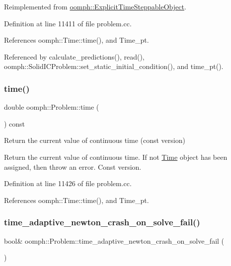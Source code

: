 Reimplemented from \hyperlink{classoomph_1_1ExplicitTimeSteppableObject_a42fde674301963f01b8e41b3f333cc65}{oomph\+::\+Explicit\+Time\+Steppable\+Object}.



Definition at line 11411 of file problem.\+cc.



References oomph\+::\+Time\+::time(), and Time\+\_\+pt.



Referenced by calculate\+\_\+predictions(), read(), oomph\+::\+Solid\+I\+C\+Problem\+::set\+\_\+static\+\_\+initial\+\_\+condition(), and time\+\_\+pt().

\mbox{\label{classoomph_1_1Problem_a925acb2e840deb4edc6305da8fced0e3}} 
\subsubsection{\texorpdfstring{time()}{time()}\hspace{0.1cm}{\footnotesize\ttfamily [2/2]}}
{\footnotesize\ttfamily double oomph\+::\+Problem\+::time (\begin{DoxyParamCaption}{ }\end{DoxyParamCaption}) const}



Return the current value of continuous time (const version) 

Return the current value of continuous time. If not \hyperlink{classoomph_1_1Time}{Time} object has been assigned, then throw an error. Const version. 

Definition at line 11426 of file problem.\+cc.



References oomph\+::\+Time\+::time(), and Time\+\_\+pt.

\mbox{\label{classoomph_1_1Problem_a7a42b89a67e0770c68493b9569bffe16}} 
\subsubsection{\texorpdfstring{time\+\_\+adaptive\+\_\+newton\+\_\+crash\+\_\+on\+\_\+solve\+\_\+fail()}{time\_adaptive\_newton\_crash\_on\_solve\_fail()}}
{\footnotesize\ttfamily bool\& oomph\+::\+Problem\+::time\+\_\+adaptive\+\_\+newton\+\_\+crash\+\_\+on\+\_\+solve\+\_\+fail (\begin{DoxyParamCaption}{ }\end{DoxyParamCaption})\hspace{0.3cm}{\ttfamily [inline]}}



